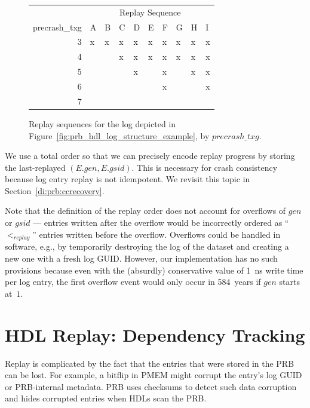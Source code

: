 \documentclass[12pt,a4paper,twoside]{book}
\begin{document}
\begin{figure}[H]
    \centering
        \begin{tabular}{r|l|l|l|l|l|l|l|l|l|}
        \multicolumn{1}{l|}{}              & \multicolumn{9}{c|}{Replay Sequence} \\
        \multicolumn{1}{c|}{precrash\_txg} & A  & B  & C  & D & E & F & G & H & I \\ \hline
        3                                  & x  & x  & x  & x & x & x & x & x & x \\
        4                                  &    &    & x  & x & x & x & x & x & x \\
        5                                  &    &    &    & x &   & x &   & x & x \\
        6                                  &    &    &    &   &   & x &   &   & x \\
        7                                  &    &    &    &   &   &   &   &   &   \\ \cline{2-10} 
    \end{tabular}
    \caption{Replay sequences for the log depicted in Figure~\ref{fig:prb_hdl_log_structure_example}, by $precrash\_txg$. }
    \label{fig:prb_hdl_log_structure_example__replay}
\end{figure}

We use a total order so that we can precisely encode replay progress by storing the last-replayed $(E.gen, E.gsid)$.
This is necessary for crash consistency because log entry replay is not idempotent.
We revisit this topic in Section~\ref{di:prb:ccrecovery}.

Note that the definition of the replay order does not account for overflows of $gen$ or $gsid$ --- entries written after the overflow would be incorrectly ordered as ``$<_{replay}$'' entries written before the overflow.
Overflows could be handled in software, e.g., by temporarily destroying the log of the dataset and creating a new one with a fresh log GUID.
However, our implementation has no such provisions because even with the (absurdly) conservative value of 1~ns write time per log entry, the first overflow event would only occur in 584~years if $gen$ starts at~$1$.

\section{HDL Replay: Dependency Tracking}\label{di:prb:deptrack}
Replay is complicated by the fact that the entries that were stored in the PRB can be lost.
For example, a bitflip in PMEM might corrupt the entry's log GUID or PRB-internal metadata.
PRB uses checksums to detect such data corruption and hides corrupted entries when HDLs scan the PRB.
\end{document}
